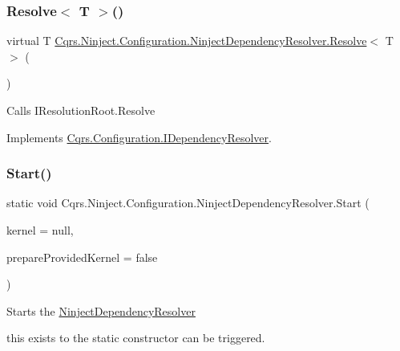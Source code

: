 \subsubsection{\texorpdfstring{Resolve$<$ T $>$()}{Resolve< T >()}}
{\footnotesize\ttfamily virtual T \hyperlink{classCqrs_1_1Ninject_1_1Configuration_1_1NinjectDependencyResolver_aef2a2be58a2562a349572e9946cd2930}{Cqrs.\+Ninject.\+Configuration.\+Ninject\+Dependency\+Resolver.\+Resolve}$<$ T $>$ (\begin{DoxyParamCaption}{ }\end{DoxyParamCaption})\hspace{0.3cm}{\ttfamily [virtual]}}



Calls I\+Resolution\+Root.\+Resolve 



Implements \hyperlink{interfaceCqrs_1_1Configuration_1_1IDependencyResolver_a9dc7694a365209a5ef05270a7cfa7b6b}{Cqrs.\+Configuration.\+I\+Dependency\+Resolver}.

\mbox{\label{classCqrs_1_1Ninject_1_1Configuration_1_1NinjectDependencyResolver_adc6171ed45679dcbaa67782770ba5083}} 
\subsubsection{\texorpdfstring{Start()}{Start()}}
{\footnotesize\ttfamily static void Cqrs.\+Ninject.\+Configuration.\+Ninject\+Dependency\+Resolver.\+Start (\begin{DoxyParamCaption}\item[{I\+Kernel}]{kernel = {\ttfamily null},  }\item[{bool}]{prepare\+Provided\+Kernel = {\ttfamily false} }\end{DoxyParamCaption})\hspace{0.3cm}{\ttfamily [static]}}



Starts the \hyperlink{classCqrs_1_1Ninject_1_1Configuration_1_1NinjectDependencyResolver}{Ninject\+Dependency\+Resolver} 

this exists to the static constructor can be triggered. 

